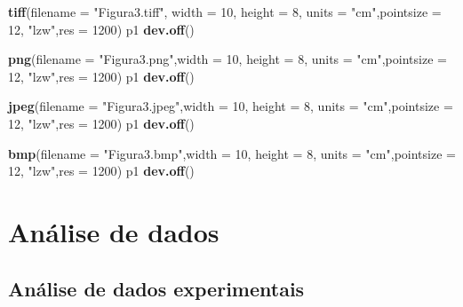 \documentclass[
]{book}
\newenvironment{Shaded}{\begin{snugshade}}{\end{snugshade}}
\newcommand{\DataTypeTok}[1]{\textcolor[rgb]{0.13,0.29,0.53}{#1}}
\newcommand{\DecValTok}[1]{\textcolor[rgb]{0.00,0.00,0.81}{#1}}
\newcommand{\KeywordTok}[1]{\textcolor[rgb]{0.13,0.29,0.53}{\textbf{#1}}}
\newcommand{\NormalTok}[1]{#1}
\newcommand{\StringTok}[1]{\textcolor[rgb]{0.31,0.60,0.02}{#1}}
\numberwithin{equation}{section}
\begin{document}
\begin{Shaded}
\begin{Highlighting}[]
\KeywordTok{tiff}\NormalTok{(}\DataTypeTok{filename =} \StringTok{"Figura3.tiff"}\NormalTok{, }\DataTypeTok{width =} \DecValTok{10}\NormalTok{, }\DataTypeTok{height =} \DecValTok{8}\NormalTok{, }
     \DataTypeTok{units =} \StringTok{"cm"}\NormalTok{,}\DataTypeTok{pointsize =} \DecValTok{12}\NormalTok{, }\StringTok{"lzw"}\NormalTok{,}\DataTypeTok{res =} \DecValTok{1200}\NormalTok{)}
\NormalTok{p1}
\KeywordTok{dev.off}\NormalTok{()}

\KeywordTok{png}\NormalTok{(}\DataTypeTok{filename =} \StringTok{"Figura3.png"}\NormalTok{,}\DataTypeTok{width =} \DecValTok{10}\NormalTok{, }\DataTypeTok{height =} \DecValTok{8}\NormalTok{, }
     \DataTypeTok{units =} \StringTok{"cm"}\NormalTok{,}\DataTypeTok{pointsize =} \DecValTok{12}\NormalTok{, }\StringTok{"lzw"}\NormalTok{,}\DataTypeTok{res =} \DecValTok{1200}\NormalTok{)}
\NormalTok{p1}
\KeywordTok{dev.off}\NormalTok{()}

\KeywordTok{jpeg}\NormalTok{(}\DataTypeTok{filename =} \StringTok{"Figura3.jpeg"}\NormalTok{,}\DataTypeTok{width =} \DecValTok{10}\NormalTok{, }\DataTypeTok{height =} \DecValTok{8}\NormalTok{, }
     \DataTypeTok{units =} \StringTok{"cm"}\NormalTok{,}\DataTypeTok{pointsize =} \DecValTok{12}\NormalTok{, }\StringTok{"lzw"}\NormalTok{,}\DataTypeTok{res =} \DecValTok{1200}\NormalTok{)}
\NormalTok{p1}
\KeywordTok{dev.off}\NormalTok{()}

\KeywordTok{bmp}\NormalTok{(}\DataTypeTok{filename =} \StringTok{"Figura3.bmp"}\NormalTok{,}\DataTypeTok{width =} \DecValTok{10}\NormalTok{, }\DataTypeTok{height =} \DecValTok{8}\NormalTok{, }
     \DataTypeTok{units =} \StringTok{"cm"}\NormalTok{,}\DataTypeTok{pointsize =} \DecValTok{12}\NormalTok{, }\StringTok{"lzw"}\NormalTok{,}\DataTypeTok{res =} \DecValTok{1200}\NormalTok{)}
\NormalTok{p1}
\KeywordTok{dev.off}\NormalTok{()}
\end{Highlighting}
\end{Shaded}

\hypertarget{part-anuxe1lise-de-dados}{%
\part{Análise de dados}\label{part-anuxe1lise-de-dados}}

\hypertarget{analdata}{%
\chapter{Análise de dados experimentais}\label{analdata}}
\end{document}

